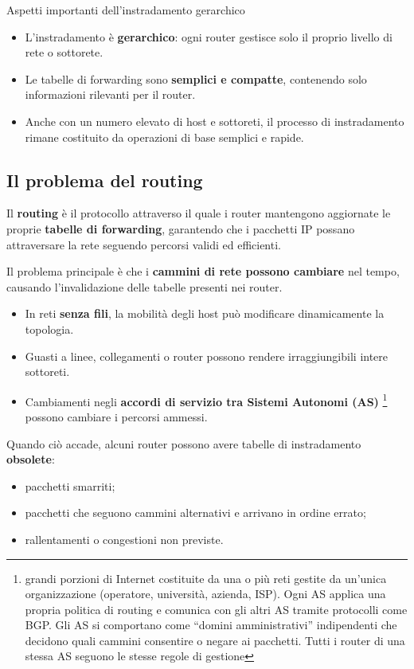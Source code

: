 \documentclass[a4paper,12pt]{report}
\begin{document}
\begin{notebox}{Aspetti importanti dell'instradamento gerarchico}
\begin{itemize}
    \item L'instradamento è \textbf{gerarchico}: ogni router gestisce solo il proprio livello di rete o sottorete.
    \item Le tabelle di forwarding sono \textbf{semplici e compatte}, contenendo solo informazioni rilevanti per il router.
    \item Anche con un numero elevato di host e sottoreti, il processo di instradamento rimane costituito da operazioni di base semplici e rapide.
\end{itemize}
\end{notebox}


\subsection{Il problema del routing}

Il \textbf{routing} è il protocollo attraverso il quale i router mantengono aggiornate le proprie
\textbf{tabelle di forwarding}, garantendo che i pacchetti IP possano attraversare la rete
seguendo percorsi validi ed efficienti.

Il problema principale è che i \textbf{cammini di rete possono cambiare} nel tempo, causando
l’invalidazione delle tabelle presenti nei router.

\begin{itemize}
    \item In reti \textbf{senza fili}, la mobilità degli host può modificare dinamicamente la topologia.
    \item Guasti a linee, collegamenti o router possono rendere irraggiungibili intere sottoreti.
    \item Cambiamenti negli \textbf{accordi di servizio tra  Sistemi Autonomi (AS)} \footnote{\textbf{} grandi porzioni di Internet costituite da una o più reti gestite da un'unica organizzazione (operatore, università, azienda, ISP).  
Ogni AS applica una propria politica di routing e comunica con gli altri AS tramite protocolli come BGP. Gli AS si comportano come “domini amministrativi” indipendenti che decidono quali cammini consentire o negare ai pacchetti. Tutti i router di una stessa AS seguono le stesse regole di gestione}
possono cambiare i percorsi ammessi.
\end{itemize}

Quando ciò accade, alcuni router possono avere tabelle di instradamento \textbf{obsolete}:
\begin{itemize}
    \item pacchetti smarriti; 
    \item pacchetti che seguono cammini alternativi e arrivano in ordine errato;
    \item rallentamenti o congestioni non previste.
\end{itemize}
\end{document}
